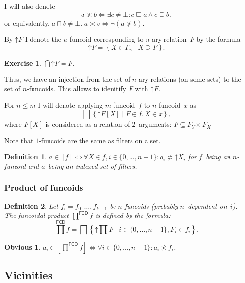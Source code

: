 \documentclass[oneside,draft]{amsart}
\newcommand{\setcond}[2]{\left\{#1\mid#2\right\}}
\newcommand{\intrs}{\not\asymp}
\newcommand{\nintrs}{\asymp}
\newcommand{\funcoids}{\mathsf{FCD}}
\newcommand{\suprel}[1]{\left[#1\right]}
\newtheorem{obvious}{Obvious}
\newtheorem{defn}{Definition}
\newtheorem{exer}{Exercise}
\begin{document}
I will also denote \[ a\intrs b \Leftrightarrow \exists c\ne\bot: c\sqsubseteq a\land c\sqsubseteq b, \] or equivalently, $a\sqcap b\ne\bot$.
$a\nintrs b\Leftrightarrow\lnot(a\intrs b)$.

By $\mathord{\uparrow}F$ I denote the $n$-fun\-co\-id corresponding to $n$-ary relation~$F$ by the formula
\[ \mathord{\uparrow}F = \setcond{X\in\Gamma_n}{X\supseteq F}. \]

\begin{exer}
$\bigcap\mathord{\uparrow}F = F$.
\end{exer}

Thus, we have an injection from the set of $n$-ary relations (on some sets) to the set of $n$-fun\-co\-ids.
This allows to idenitify $F$ with $\mathord{\uparrow}F$.

For $n\leq m$ I will denote applying $m$-fun\-co\-id~$f$ to $n$-fun\-co\-id~$x$ as
\[ \bigsqcap\setcond{\mathord{\uparrow} F[X]}{F\in f,X\in x}, \]
where $F[X]$ is considered as a relation of $2$~arguments: $F\subseteq F_Y\times F_X$.

Note that $1$-fun\-co\-ids are the same as filters on a set.

\begin{defn}
$a\in\suprel{f} \Leftrightarrow \forall X\in f, i\in\{0,\dots,n-1\}: a_i \intrs \mathord{\uparrow}X_i$ for $f$~being an $n$-fun\-co\-id and $a$~being an indexed set of filters.
\end{defn}

\subsubsection{Product of funcoids}

\begin{defn}
Let $f_i = f_0,\dots,f_{k-1}$ be $n$-fun\-co\-ids (probably $n$~dependent on~$i$). The \emph{funcoidal product} $\prod^{\funcoids}f$ is defined by the formula:
\[
\prod^{\funcoids}f = \bigsqcap\setcond{\mathord{\uparrow}\prod F}{i\in\{0,\dots,n-1\}, F_i\in f_i}.
\]
\end{defn}

\begin{obvious}
$a_i\in\suprel{\prod^{\funcoids}f} \Leftrightarrow \forall i\in\{0,\dots,n-1\}: a_i\intrs f_i$.
\end{obvious}

\subsection{Vicinities}
\end{document}
